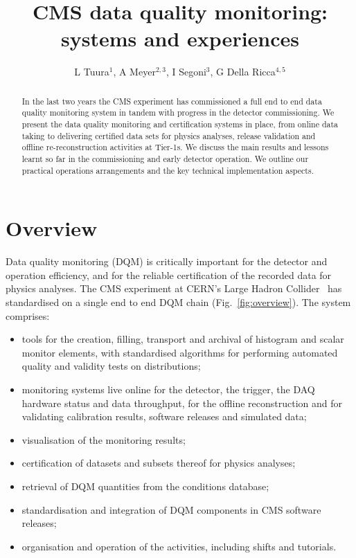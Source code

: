 \documentclass[a4paper]{jpconf}
\begin{document}
\title{CMS data quality monitoring: systems and experiences}
\author{L Tuura$^1$, A Meyer$^{2,3}$, I Segoni$^3$, G Della Ricca$^{4,5}$}
\address{$^1$ Northeastern University, Boston, MA, USA}
\address{$^2$ DESY, Hamburg, Germany}
\address{$^3$ CERN, Geneva, Switzerland}
\address{$^4$ INFN Sezione di Trieste, Trieste, Italy}
\address{$^5$ Universit\`a di Trieste, Trieste, Italy}

\begin{abstract}
In the last two years the CMS experiment has commissioned a full end to end
data quality monitoring system in tandem with progress in the detector
commissioning.  We present the data quality monitoring and certification
systems in place, from online data taking to delivering certified data sets
for physics analyses, release validation and offline re-reconstruction
activities at Tier-1s.  We discuss the main results and lessons learnt so far
in the commissioning and early detector operation.  We outline our practical
operations arrangements and the key technical implementation aspects.
\end{abstract}


\section{Overview}

Data quality monitoring (DQM) is critically important for the detector and
operation efficiency, and for the reliable certification of the recorded data
for physics analyses.  The CMS experiment at CERN's Large Hadron
Collider~\cite{cms_tp} has standardised on a single end to end DQM chain
(Fig.~\ref{fig:overview}).  The system comprises:

\begin{itemize}
  \item tools for the creation, filling, transport and archival of histogram
    and scalar monitor elements, with standardised algorithms for performing
    automated quality and validity tests on distributions;
  \item monitoring systems live online for the detector, the trigger, the
    DAQ hardware status and data throughput, for the offline reconstruction
    and for validating calibration results, software releases and simulated
    data;
  \item visualisation of the monitoring results;
  \item certification of datasets and subsets thereof for physics analyses;
  \item retrieval of DQM quantities from the conditions database;
  \item standardisation and integration of DQM components in CMS software releases;
  \item organisation and operation of the activities, including shifts and tutorials.
\end{itemize}
\end{document}
